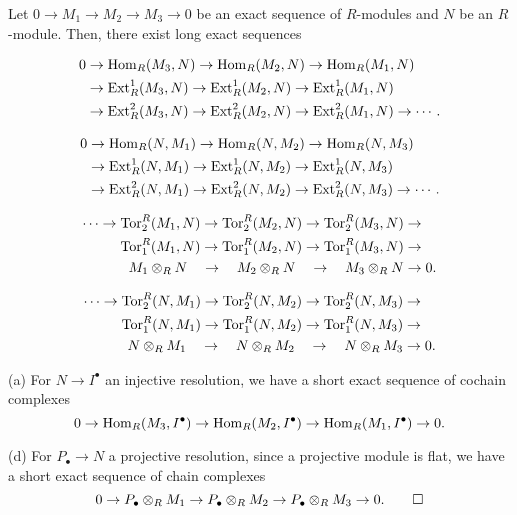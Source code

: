\documentclass{../../../small}
\begin{document}
\begin{thm*}[2.4.4]
Let $0\to M_1\to M_2\to M_3\to0$ be an exact sequence of $R$-modules and $N$ be an $R$-module.
Then, there exist long exact sequences
\begin{parts}
\item
\begin{align*}
0&\to\operatorname{Hom}_R(M_3,N)\to\operatorname{Hom}_R(M_2,N)\to\operatorname{Hom}_R(M_1,N)\\
&\to\operatorname{Ext}_R^1(M_3,N)\to\operatorname{Ext}_R^1(M_2,N)\to\operatorname{Ext}_R^1(M_1,N)\\
&\to\operatorname{Ext}_R^2(M_3,N)\to\operatorname{Ext}_R^2(M_2,N)\to\operatorname{Ext}_R^2(M_1,N)\to\cdots.
\end{align*}
\item
\begin{align*}
0&\to\operatorname{Hom}_R(N,M_1)\to\operatorname{Hom}_R(N,M_2)\to\operatorname{Hom}_R(N,M_3)\\
&\to\operatorname{Ext}_R^1(N,M_1)\to\operatorname{Ext}_R^1(N,M_2)\to\operatorname{Ext}_R^1(N,M_3)\\
&\to\operatorname{Ext}_R^2(N,M_1)\to\operatorname{Ext}_R^2(N,M_2)\to\operatorname{Ext}_R^2(N,M_3)\to\cdots.
\end{align*}
\item
\begin{align*}
\cdots\to\operatorname{Tor}^R_2(M_1,N)\to\operatorname{Tor}^R_2(M_2,N)\to\operatorname{Tor}^R_2(M_3,N)&\to\\
\operatorname{Tor}^R_1(M_1,N)\to\operatorname{Tor}^R_1(M_2,N)\to\operatorname{Tor}^R_1(M_3,N)&\to\\
M_1\otimes_RN\quad\to\quad M_2\otimes_RN\quad\to\quad M_3\otimes_RN&\to0.
\end{align*}
\item
\begin{align*}
\cdots\to\operatorname{Tor}^R_2(N,M_1)\to\operatorname{Tor}^R_2(N,M_2)\to\operatorname{Tor}^R_2(N,M_3)&\to\\
\operatorname{Tor}^R_1(N,M_1)\to\operatorname{Tor}^R_1(N,M_2)\to\operatorname{Tor}^R_1(N,M_3)&\to\\
N\otimes_RM_1\quad\to\quad N\otimes_RM_2\quad\to\quad N\otimes_RM_3&\to0.
\end{align*}
\end{parts}
\end{thm*}
\begin{pf}
(a)
For $N\to I^\bullet$ an injective resolution, we have a short exact sequence of cochain complexes
\[0\to\operatorname{Hom}_R(M_3,I^\bullet)\to\operatorname{Hom}_R(M_2,I^\bullet)\to\operatorname{Hom}_R(M_1,I^\bullet)\to0.\]

(d)
For $P_\bullet\to N$ a projective resolution, since a projective module is flat, we have a short exact sequence of chain complexes
\[0\to P_\bullet\otimes_RM_1\to P_\bullet\otimes_RM_2\to P_\bullet\otimes_RM_3\to0.\qedhere\]
\end{pf}
\end{document}
